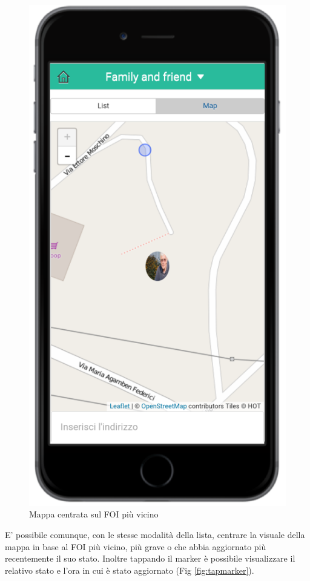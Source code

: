 \begin{itemize}
\begin{figure}[H]
	\includegraphics[scale=1]{interfaccia/mappafoi.png}
	\caption{Mappa centrata sul FOI più vicino }
	\label{fig:mappafoi}
\end{figure}
E' possibile comunque, con le stesse modalità della lista, centrare la visuale della mappa in base al FOI più vicino, più grave o che abbia aggiornato più recentemente il suo stato. Inoltre tappando il marker è possibile visualizzare il relativo stato e l'ora in cui è stato aggiornato (Fig \ref{fig:tapmarker}).
\begin{figure}[H]

\end{figure}
\end{itemize}
